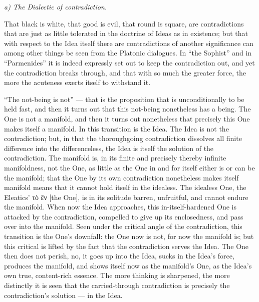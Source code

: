 \documentclass[12pt]{book}
\begin{document}
\emph{a) The Dialectic of contradiction.}

That black is white, that good is evil, that round is square, are contradictions that are just as
little tolerated in the doctrine of Ideas as in existence; but that with respect to the Idea itself
there are contradictions of another significance can among other things be seen from the Platonic
dialogues. In ``the Sophist'' and in ``Parmenides''
it is indeed expressly set out to keep the contradiction out, and yet the contradiction breaks
through, and that with so much the greater force, the more the acuteness exerts itself to withstand
it.

``The not-being is not'' — that is the proposition that is unconditionally to be held fast, and then
it turns out that this not-being nonetheless has a being. The One is not a manifold, and then it
turns out nonetheless that precisely this One makes itself a manifold. In this transition is the
Idea. The Idea is not the contradiction; but, in that the thoroughgoing contradiction dissolves all
finite difference into the differenceless, the Idea is itself the solution of the contradiction. The
manifold is, in its finite and precisely thereby infinite manifoldness, not the One, as little as
the One in and for itself either is or can be the manifold; that the One by its own contradiction
nonetheless makes itself manifold means that it cannot hold itself in the idealess. The idealess
One, the Eleatics' τὸ ἕν [the One], is in its solitude barren, unfruitful, and cannot endure the
manifold. When now the Idea approaches, this in-itself-hardened One is attacked by the contradiction,
compelled to give up its enclosedness, and pass over into the manifold. Seen under the critical angle
of the contradiction, this transition is the One's downfall: the One now is not, for now the manifold
is; but this critical is lifted by the fact that the contradiction serves the Idea. The One then does
not perish, no, it goes up into the Idea, sucks in the Idea's force, produces the manifold, and shows
itself now as the manifold's One, as the Idea's own true, content-rich essence. The more thinking is
sharpened, the more distinctly it is seen that the carried-through contradiction is precisely the
contradiction's solution — in the Idea.
\end{document}
